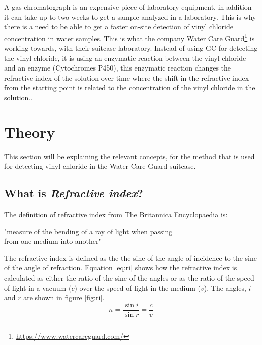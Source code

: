\documentclass{article}
\begin{document}
A gas chromatograph is an expensive piece of laboratory equipment\cite{gc_cost_axion}, in addition it can take up to two weeks to get a sample analyzed in a laboratory\cite{water_analysis_cwt}.
This is why there is a need to be able to get a faster on-site detection of vinyl chloride concentration in water samples.
This is what the company Water Care Guard\footnote{\url{https://www.watercareguard.com/}} is working towards, with their suitcase laboratory.
Instead of using GC for detecting the vinyl chloride, it is using an enzymatic reaction between the vinyl chloride and an enzyme (Cytochromes P450), this enzymatic reaction changes the refractive index of the solution over time where the shift in the refractive index from the starting point is related to the concentration of the vinyl chloride in the solution.\cite{roana_vc_ri}\cite{Ghanayem2007-nb}.

\newpage
\section{Theory}
This section will be explaining the relevant concepts, for the method that is used for detecting vinyl chloride in the Water Care Guard suitcase.

\subsection{What is \textit{Refractive index}?}
The definition of refractive index from The Britannica Encyclopaedia is:
\begin{center}
"measure of the bending of a ray of light when passing\\from one medium into another"\cite{ri_britannica}
\end{center}

The refractive index is defined as the the sine of the angle of incidence to the sine of the angle of refraction.\cite{ri_britannica}
Equation \ref{eq:ri} shows how the refractive index is calculated as either the ratio of the sine of the angles or as the ratio of the speed of light in a vacuum ($c$) over the speed of light in the medium ($v$).\cite{ri_mettler_toledo}
The angles, $i$ and $r$ are shown in figure \ref{fig:ri}.
\begin{equation}\label{eq:ri}
    n = \frac{\sin{i}}{\sin{r}} = \frac{c}{v}
\end{equation}
\end{document}
